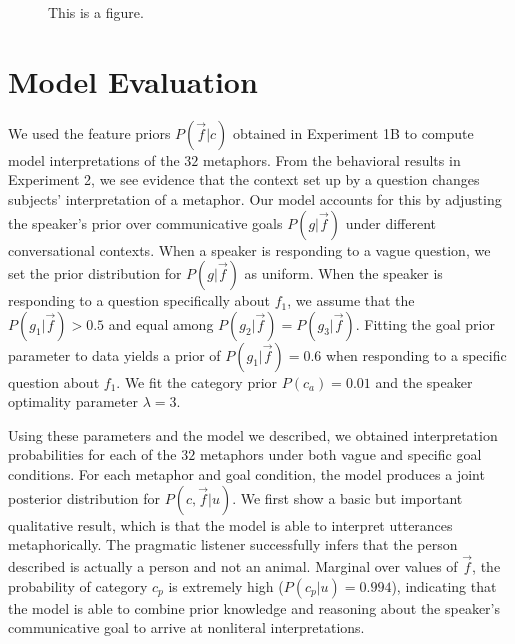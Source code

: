 \documentclass[10pt,letterpaper]{article}
\begin{document}
\begin{figure}[ht]
\begin{center}
\end{center}
\caption{This is a figure.} 
\label{scatter_full}
\end{figure}

\section{Model Evaluation}
We used the feature priors $P(\vec f | c)$ obtained in Experiment 1B to compute model interpretations of the $32$ metaphors. From the behavioral results in Experiment 2, we see evidence that the context set up by a question changes subjects' interpretation of a metaphor. Our model accounts for this by adjusting the speaker's prior over communicative goals $P(g | \vec f)$ under different conversational contexts. When a speaker is responding to a vague question, we set the prior distribution for $P(g | \vec f)$ as uniform. When the speaker is responding to a question specifically about $f_1$, we assume that the $P(g_1 | \vec f) > 0.5$ and equal among $P(g_2 | \vec f) = P(g_3 | \vec f)$. Fitting the goal prior parameter to data yields a prior of $P(g_1 | \vec f) = 0.6$ when responding to a specific question about $f_1$. We fit the category prior $P(c_a) = 0.01$ and the speaker optimality parameter $\lambda = 3$.

Using these parameters and the model we described, we obtained interpretation probabilities for each of the $32$ metaphors under both vague and specific goal conditions. For each metaphor and goal condition, the model produces a joint posterior distribution for $P(c, \vec f | u)$. We first show a basic but important qualitative result, which is that the model is able to interpret utterances metaphorically. The pragmatic listener successfully infers that the person described is actually a person and not an animal. Marginal over values of $\vec f$, the probability of category $c_p$ is extremely high ($P(c_p | u) = 0.994$), indicating that the model is able to combine prior knowledge and reasoning about the speaker's communicative goal to arrive at nonliteral interpretations.
\end{document}
